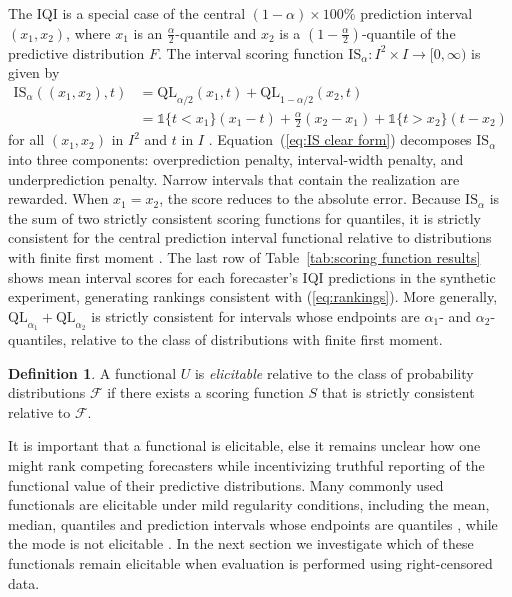 \documentclass[10pt]{article} %
\theoremstyle{theorem}
\theoremstyle{definition}
\newtheorem{defn}{Definition}
\newcommand{\one}{\mathds{1}}
\newcommand{\QL}{\mathrm{QL}}
\newcommand{\IS}{\mathrm{IS}}
\begin{document}
The IQI is a special case of the central $(1-\alpha)\times 100$\% prediction interval $(x_1, x_2)$, where $x_1$ is an $\tfrac{\alpha}{2}$-quantile and $x_2$ is a $(1-\tfrac{\alpha}{2})$-quantile of the predictive distribution $F$. The interval scoring function $\IS_{\alpha}: I^2 \times I \to [0,\infty)$ is given by
\begin{align}
\IS_\alpha((x_1, x_2), t)
&=\QL_{\alpha/2}(x_1,t) + \QL_{1-\alpha/2}(x_2,t) \\
&=\one\{t<x_1\}(x_1-t) + \tfrac{\alpha}{2}(x_2-x_1) + \one\{t>x_2\}(t-x_2) \label{eq:IS clear form}
\end{align}
for all $(x_1, x_2)$ in $I^2$ and $t$ in $I$ \citep{gneiting2007strictly}. Equation~(\ref{eq:IS clear form}) decomposes $\IS_{\alpha}$ into three components: overprediction penalty, interval-width penalty, and underprediction penalty. Narrow intervals that contain the realization are rewarded. When $x_1=x_2$, the score reduces to the absolute error. Because $\IS_{\alpha}$ is the sum of two strictly consistent scoring functions for quantiles, it is strictly consistent for the central prediction interval functional relative to distributions with finite first moment \citep[Lemma~2.6]{fissler2016higher}. The last row of Table~\ref{tab:scoring function results} shows mean interval scores for each forecaster’s IQI predictions in the synthetic experiment, generating rankings consistent with (\ref{eq:rankings}). More generally, $\QL_{\alpha_1}+\QL_{\alpha_2}$ is strictly consistent for intervals whose endpoints are $\alpha_1$- and $\alpha_2$-quantiles, relative to the class of distributions with finite first moment.


\begin{defn}\label{def:elicitability}\citep{lambert2008eliciting}
A functional $U$ is \textit{elicitable} relative to the class of probability distributions $\mathcal{F}$ if there exists a scoring function $S$ that is strictly consistent relative to $\mathcal{F}$.
\end{defn}

It is important that a functional is elicitable, else it remains unclear how one might rank competing forecasters while incentivizing truthful reporting of the functional value of their predictive distributions. Many commonly used functionals are elicitable under mild regularity conditions, including the mean, median, quantiles and prediction intervals whose endpoints are quantiles \citep{savage1971elicitation, thomson1978eliciting, saerens2000building}, while the mode is not elicitable \citep{heinrich2014mode}.
In the next section we investigate which of these functionals remain elicitable when evaluation is performed using right-censored data.
\end{document}
